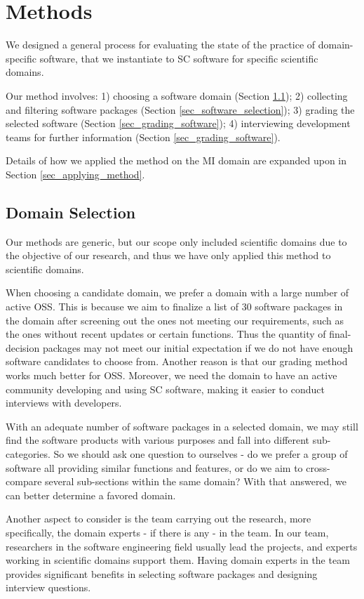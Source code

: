 \chapter{Methods}
\label{ch_methods}

We designed a general process for evaluating the state of the practice of domain-specific software, that we instantiate to SC software for specific scientific domains.

Our method involves: 1) choosing a software domain (Section \ref{sec_domain_selection}); 2) collecting and filtering software packages (Section \ref{sec_software_selection}); 3) grading the selected software (Section \ref{sec_grading_software}); 4) interviewing development teams for further information (Section \ref{sec_grading_software}).

Details of how we applied the method on the MI domain are expanded upon in Section \ref{sec_applying_method}.

\section{Domain Selection}
\label{sec_domain_selection}
Our methods are generic, but our scope only included scientific domains due to the objective of our research, and thus we have only applied this method to scientific domains.

When choosing a candidate domain, we prefer a domain with a large number of active OSS. This is because we aim to finalize a list of 30 software packages \cite{SmithEtAl2021} in the domain after screening out the ones not meeting our requirements, such as the ones without recent updates or certain functions. Thus the quantity of final-decision packages may not meet our initial expectation if we do not have enough software candidates to choose from. Another reason is that our grading method works much better for OSS. Moreover, we need the domain to have an active community developing and using SC software, making it easier to conduct interviews with developers.

With an adequate number of software packages in a selected domain, we may still find the software products with various purposes and fall into different sub-categories. So we should ask one question to ourselves - do we prefer a group of software all providing similar functions and features, or do we aim to cross-compare several sub-sections within the same domain? With that answered, we can better determine a favored domain.

Another aspect to consider is the team carrying out the research, more specifically, the domain experts - if there is any - in the team. In our team, researchers in the software engineering field usually lead the projects, and experts working in scientific domains support them. Having domain experts in the team provides significant benefits in selecting software packages and designing interview questions.

